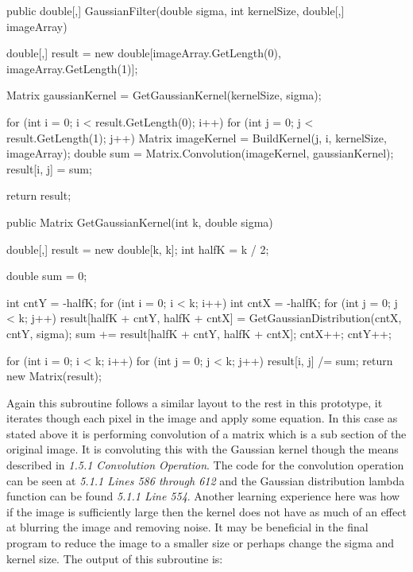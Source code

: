 \begin{flushleft}
        \begin{cscode}
public double[,] GaussianFilter(double sigma, int kernelSize, double[,] imageArray)
{
    double[,] result = new double[imageArray.GetLength(0), imageArray.GetLength(1)];

    Matrix gaussianKernel = GetGaussianKernel(kernelSize, sigma);

    for (int i = 0; i < result.GetLength(0); i++)
    {
        for (int j = 0; j < result.GetLength(1); j++)
        {
            Matrix imageKernel = BuildKernel(j, i, kernelSize, imageArray);
            double sum = Matrix.Convolution(imageKernel, gaussianKernel);
            result[i, j] = sum;
        }
    }

    return result;
}
        
public Matrix GetGaussianKernel(int k, double sigma)
{
    double[,] result = new double[k, k];
    int halfK = k / 2;

    double sum = 0;

    int cntY = -halfK;
    for (int i = 0; i < k; i++)
    {
        int cntX = -halfK;
        for (int j = 0; j < k; j++)
        {
            result[halfK + cntY, halfK + cntX] = GetGaussianDistribution(cntX, cntY, sigma);
            sum += result[halfK + cntY, halfK + cntX];
            cntX++;
        }
        cntY++;
    }

    for (int i = 0; i < k; i++) for (int j = 0; j < k; j++) result[i, j] /= sum;
    return new Matrix(result);
}
        \end{cscode}
        
        Again this subroutine follows a similar layout to the rest in this prototype, it iterates though each pixel in the image and apply some equation. In this case as stated above it is performing convolution of a matrix which is a sub section of the original image. It is convoluting this with the Gaussian kernel though the means described in \textit{1.5.1 Convolution Operation}. The code for the convolution operation can be seen at \textit{5.1.1 Lines 586 through 612} and the Gaussian distribution lambda function can be found \textit{5.1.1 Line 554}. Another learning experience here was how if the image is sufficiently large then the kernel does not have as much of an effect at blurring the image and removing noise. It may be beneficial in the final program to reduce the image to a smaller size or perhaps change the sigma and kernel size. The output of this subroutine is: \\ \bk


\end{flushleft}
